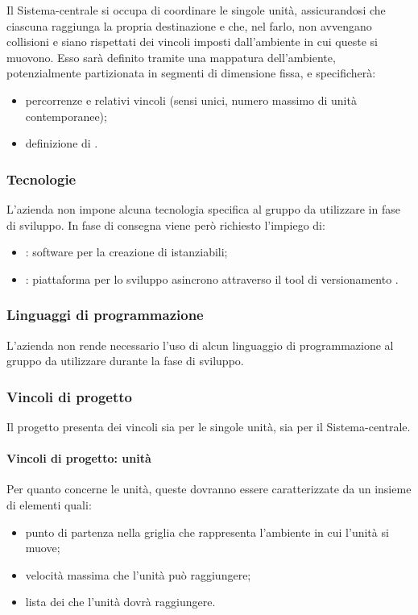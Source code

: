 \documentclass[]{article}
\begin{document}
			Il Sistema-centrale si occupa di coordinare le singole unità, assicurandosi che ciascuna raggiunga la propria destinazione e che, nel farlo, non avvengano collisioni e siano rispettati dei vincoli imposti dall'ambiente in cui queste si muovono.
			Esso sarà definito tramite una mappatura dell'ambiente, potenzialmente partizionata in segmenti di dimensione fissa, e specificherà:
			\begin{itemize}
				\item percorrenze e relativi vincoli (sensi unici, numero massimo di unità contemporanee);
				\item definizione di .
			\end{itemize}

			\subsubsection{Tecnologie}
			L'azienda non impone alcuna tecnologia specifica al gruppo da utilizzare in fase di sviluppo.
			In fase di consegna viene però richiesto l'impiego di:
			\begin{itemize}
				\item \textsc{}: software per la creazione di  istanziabili;
				\item \textsc{}: piattaforma per lo sviluppo asincrono attraverso il tool di versionamento .
			\end{itemize}

			\subsubsection{Linguaggi di programmazione}
			L'azienda non rende necessario l'uso di alcun linguaggio di programmazione al gruppo da utilizzare durante la fase di sviluppo.

			\subsubsection{Vincoli di progetto}
			Il progetto presenta dei vincoli sia per le singole unità, sia per il Sistema-centrale.

			\paragraph{Vincoli di progetto: unità}
			Per quanto concerne le unità, queste dovranno essere caratterizzate da un insieme di elementi quali:
			\begin{itemize}
				\item punto di partenza nella griglia che rappresenta l'ambiente in cui l'unità si muove;
				\item velocità massima che l'unità può raggiungere;
				\item lista dei  che l'unità dovrà raggiungere.
			\end{itemize}
\end{document}
